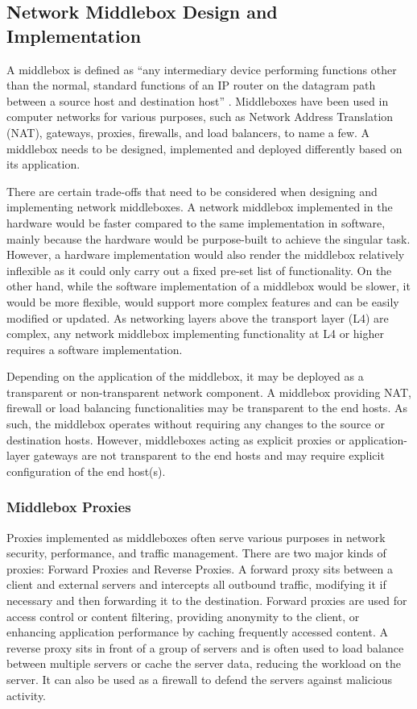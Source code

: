 \subsection{Network Middlebox Design and Implementation}
\label{subsec:netshaper-background-network-middlebox-designs}

A middlebox is defined as ``any intermediary device performing functions other than the normal, standard functions of an IP router on the datagram path between a source host and destination host'' \cite{rfc3234middleboxes}.
Middleboxes have been used in computer networks for various purposes, such as Network Address Translation (NAT), gateways, proxies, firewalls, and load balancers, to name a few.
A middlebox needs to be designed, implemented and deployed differently based on its application.

There are certain trade-offs that need to be considered when designing and implementing network middleboxes.
A network middlebox implemented in the hardware would be faster compared to the same implementation in software, mainly because the hardware would be purpose-built to achieve the singular task.
However, a hardware implementation would also render the middlebox relatively inflexible as it could only carry out a fixed pre-set list of functionality.
On the other hand, while the software implementation of a middlebox would be slower, it would be more flexible, would support more complex features and can be easily modified or updated.
As networking layers above the transport layer (L4) are complex, any network middlebox implementing functionality at L4 or higher requires a software implementation.

Depending on the application of the middlebox, it may be deployed as a transparent or non-transparent network component.
A middlebox providing NAT, firewall or load balancing functionalities may be transparent to the end hosts.
As such, the middlebox operates without requiring any changes to the source or destination hosts.
However, middleboxes acting as explicit proxies or application-layer gateways are not transparent to the end hosts and may require explicit configuration of the end host(s).

\subsubsection{Middlebox Proxies}
\label{netshaper-background-middlebox-proxies}

Proxies implemented as middleboxes often serve various purposes in network security, performance, and traffic management.
There are two major kinds of proxies: Forward Proxies and Reverse Proxies.
A forward proxy sits between a client and external servers and intercepts all outbound traffic, modifying it if necessary and then forwarding it to the destination.
Forward proxies are used for access control or content filtering, providing anonymity to the client, or enhancing application performance by caching frequently accessed content.
A reverse proxy sits in front of a group of servers and is often used to load balance between multiple servers or cache the server data, reducing the workload on the server. 
It can also be used as a firewall to defend the servers against malicious activity.


